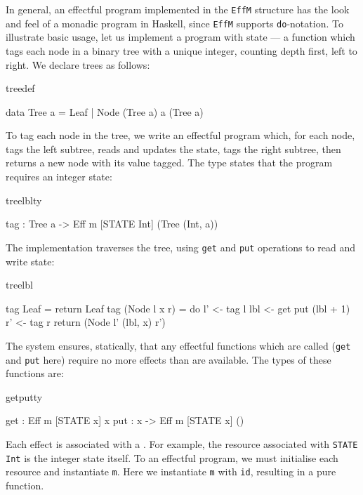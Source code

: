 In general, an effectful program implemented in the \texttt{EffM} structure has
the look and feel of a monadic program in Haskell, since \texttt{EffM} supports
\texttt{do}-notation. To illustrate basic usage, let us implement
a program with state --- a function which tags each node in a binary tree with
a unique integer, counting depth first, left to right. We declare trees as
follows:

\begin{SaveVerbatim}{treedef}

data Tree a = Leaf 
            | Node (Tree a) a (Tree a)

\end{SaveVerbatim}

\noindent
To tag each node in the tree, we write an effectful program which, for each
node, tags the left subtree, reads and updates the state, tags the right
subtree, then returns a new node with its value tagged. The type
states that the program requires an integer state:

\begin{SaveVerbatim}{treelblty}

tag : Tree a -> Eff m [STATE Int] (Tree (Int, a))

\end{SaveVerbatim}

\noindent
The implementation traverses the tree, using \texttt{get} and \texttt{put}
operations to read and write state:

\begin{SaveVerbatim}{treelbl}

tag Leaf = return Leaf
tag (Node l x r) 
     = do l' <- tag l
          lbl <- get
          put (lbl + 1)
          r' <- tag r
          return (Node l' (lbl, x) r')

\end{SaveVerbatim}

\noindent
The \Eff{} system ensures, statically, that any
effectful functions which are called (\texttt{get} and \texttt{put} here)
require no more effects than are available.
The types of these functions are:

\begin{SaveVerbatim}{getputty}

get : Eff m [STATE x] x
put : x -> Eff m [STATE x] ()

\end{SaveVerbatim}

\noindent
Each effect is associated with a . For example, the resource
associated with \texttt{STATE Int} is the integer state itself.  To 
an effectful program, we must initialise each resource and instantiate
\texttt{m}. Here we instantiate \texttt{m} with \texttt{id}, resulting in a
pure function.

